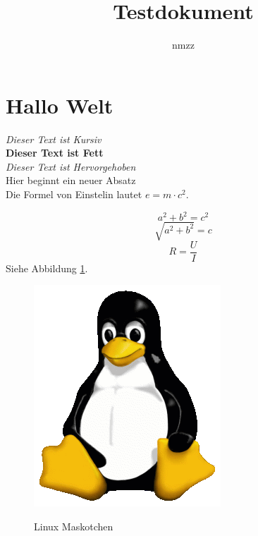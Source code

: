 \documentclass[a4paper,fleqn]{article}
\title{Testdokument}
\author{nmzz}
\begin{document}
\maketitle
\newpage
\tableofcontents
\newpage

\section{Hallo Welt}
\textit{Dieser Text ist Kursiv}\\
\textbf{Dieser Text ist Fett}\\
\emph{Dieser Text ist Hervorgehoben}\\
%
Hier beginnt ein neuer Absatz\\
Die Formel von Einstelin lautet $e = m \cdot c^2$.

\[a^2 + b^2 = c^2\]
\[\sqrt{a^2 + b^2} = c\]
\[R = \frac{U}{I}\]
Siehe Abbildung \ref{tux}. 


\begin{figure}[h!]
\includegraphics{Tux.png}
\label{tux}
\caption{Linux Maskotchen}
\end{figure}

\listoffigures
\end{document}
